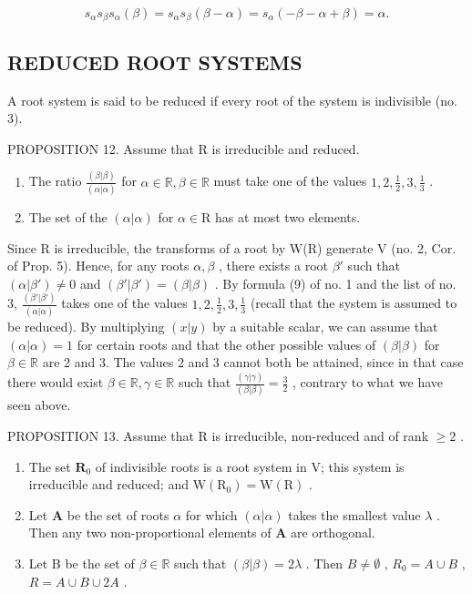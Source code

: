 \[
s _ {\alpha} s _ {\beta} s _ {\alpha} (\beta) = s _ {\alpha} s _ {\beta} (\beta - \alpha) = s _ {\alpha} (- \beta - \alpha + \beta) = \alpha .
\]

\subsection{REDUCED ROOT SYSTEMS}

A root system is said to be reduced if every root of the system is indivisible (no. 3).

PROPOSITION 12. Assume that R is irreducible and reduced.

\begin{enumerate}
\def\labelenumi{(\roman{enumi})}
\item
  The ratio \(\frac{(\beta|\beta)}{(\alpha|\alpha)}\) for \(\alpha \in \mathbb{R}, \beta \in \mathbb{R}\) must take one of the values \(1, 2, \frac{1}{2}, 3, \frac{1}{3}\) .
\item
  The set of the \((\alpha |\alpha)\) for \(\alpha \in \mathrm{R}\) has at most two elements.
\end{enumerate}

Since R is irreducible, the transforms of a root by W(R) generate V (no. 2, Cor. of Prop. 5). Hence, for any roots \(\alpha, \beta\) , there exists a root \(\beta'\) such that \((\alpha|\beta') \neq 0\) and \((\beta'|\beta') = (\beta|\beta)\) . By formula (9) of no. 1 and the list of no. 3, \(\frac{(\beta'|\beta')}{(\alpha|\alpha)}\) takes one of the values \(1, 2, \frac{1}{2}, 3, \frac{1}{3}\) (recall that the system is assumed to be reduced). By multiplying \((x|y)\) by a suitable scalar, we can assume that \((\alpha|\alpha) = 1\) for certain roots and that the other possible values of \((\beta|\beta)\) for \(\beta \in \mathbb{R}\) are 2 and 3. The values 2 and 3 cannot both be attained, since in that case there would exist \(\beta \in \mathbb{R}, \gamma \in \mathbb{R}\) such that \(\frac{(\gamma|\gamma)}{(\beta|\beta)} = \frac{3}{2}\) , contrary to what we have seen above.

PROPOSITION 13. Assume that R is irreducible, non-reduced and of rank \(\geqslant 2\) .

\begin{enumerate}
\def\labelenumi{(\roman{enumi})}
\item
  The set \(\mathbf{R}_0\) of indivisible roots is a root system in V; this system is irreducible and reduced; and \(\mathrm{W}(\mathrm{R}_0) = \mathrm{W}(\mathrm{R})\) .
\item
  Let \(\mathbf{A}\) be the set of roots \(\alpha\) for which \((\alpha |\alpha)\) takes the smallest value \(\lambda\) . Then any two non-proportional elements of \(\mathbf{A}\) are orthogonal.
\item
  Let B be the set of \(\beta \in \mathbb{R}\) such that \((\beta |\beta) = 2\lambda\) . Then \(B \neq \emptyset\) , \(R_0 = A \cup B\) , \(R = A \cup B \cup 2A\) .
\end{enumerate}

